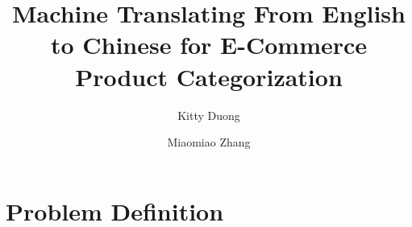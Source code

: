 \documentclass[sigconf]{acmart}
\begin{document}
    \title{Machine Translating From English to Chinese for E-Commerce Product Categorization}
    \author{Kitty Duong}

    \author{Miaomiao Zhang}

    \begin{abstract}

    \end{abstract}

    \section{Problem Definition}
\end{document}
